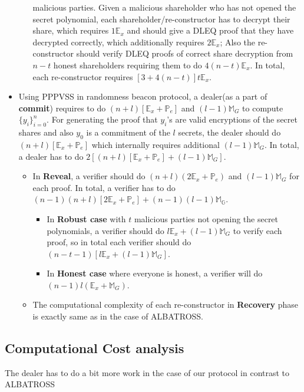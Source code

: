 \begin{itemize}
\begin{itemize}
            malicious parties. Given a malicious shareholder who has not opened 
            the secret polynomial, each shareholder/re-constructor has to 
            decrypt their share, which requires $1\mathbb{E}_{x}$ and should 
            give a DLEQ proof that they have decrypted correctly, which 
            additionally requires $2\mathbb{E}_x$; Also the re-constructor 
            should verify DLEQ proofs of correct share decryption from $n-t$ 
            honest shareholders requiring them to do $4(n-t)\mathbb{E}_{x}$. 
            In total, each re-constructor requires $[3+4(n-t)]t\mathbb{E}_{x}$.
        \end{itemize}
    \item Using PPPVSS in randomness beacon protocol, a dealer(as a part of \textbf{commit}) requires to do $(n+l)[\mathbb{E}_x+\mathbb{P}_e]$ and $(l-1)\mathbb{M}_G$ to compute $\{y_i\}_{i=0}^{n}$. For generating the proof that $y_i$'s are valid encryptions of the secret shares and also $y_0$ is a commitment of the $l$ secrets, the dealer should do $(n+l)[\mathbb{E}_x+\mathbb{P}_e]$ which internally requires additional $(l-1)\mathbb{M}_G$. In total, a dealer has to do $2\left[(n+l)[\mathbb{E}_x+\mathbb{P}_e]+(l-1)\mathbb{M}_{G}\right]$.
    \begin{itemize}
        \item In \textbf{Reveal}, a verifier should do $(n+l)(2\mathbb{E}_x+\mathbb{P}_e)$ and $(l-1)\mathbb{M}_G$ for each proof. In total, a verifier has to do $(n-1)(n+l)[2\mathbb{E}_x+\mathbb{P}_e]+(n-1)(l-1)\mathbb{M_G}$.
        \begin{itemize}
            \item In \textbf{Robust case} with $t$ malicious parties not opening the secret polynomials, a verifier should do $l\mathbb{E}_x+(l-1)\mathbb{M}_G$ to verify each proof, so in total each verifier should do $(n-t-1)[l\mathbb{E}_x+(l-1)\mathbb{M}_G]$.
            \item In \textbf{Honest case} where everyone is honest, a verifier will do $(n-1)l(\mathbb{E}_x+\mathbb{M}_G)$.
        \end{itemize}
        \item The computational complexity of each re-constructor in \textbf{Recovery} phase is exactly same as in the case of ALBATROSS.
    \end{itemize}
\end{itemize}

\subsection{Computational Cost analysis}
The dealer has to do a bit more work in the case of our protocol in contrast to 
ALBATROSS


